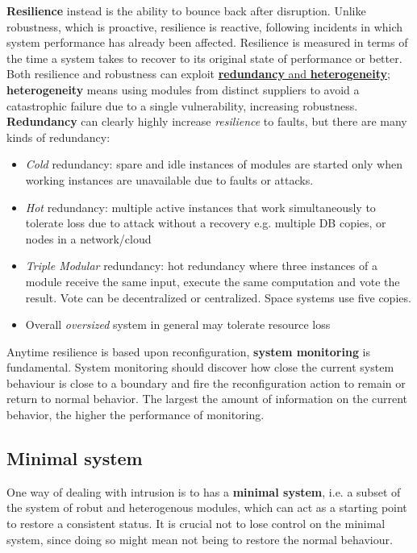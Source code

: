 \textbf{Resilience} instead is the ability to bounce back after disruption. Unlike
robustness, which is proactive, resilience is reactive, following
incidents in which system performance has already been affected.
Resilience is measured in terms of the time a system takes to recover
to its original state of performance or better.
\nl
Both resilience and robustness can exploit \ul{\textbf{redundancy} and \textbf{heterogeneity}};\\
\textbf{heterogeneity} means using modules from distinct suppliers to avoid a catastrophic failure due to a single vulnerability, increasing robustness.\\
\textbf{Redundancy} can clearly highly increase \textit{resilience} to faults,
but there are many kinds of redundancy:
\begin{itemize}
    \item \textit{Cold} redundancy: spare and idle instances of modules are started only when working instances are unavailable due to faults or attacks.
    \item \textit{Hot} redundancy: multiple active instances that work simultaneously to tolerate loss due to attack without a recovery e.g. multiple DB copies, or nodes in a network/cloud
    \item \textit{Triple Modular} redundancy: hot redundancy where three instances of a
    module receive the same input, execute the same computation and vote the
    result. Vote can be decentralized or centralized. Space systems use five copies.
    \item Overall \textit{oversized} system in general may tolerate resource loss
\end{itemize}

Anytime resilience is based upon reconfiguration, \textbf{system monitoring} is fundamental.
System monitoring should discover how close the current system behaviour is close to a boundary and fire the reconfiguration action to remain or return to normal behavior.
The largest the amount of information on the current behavior, the higher the performance of monitoring.

\subsection{Minimal system}
One way of dealing with intrusion is to has a \textbf{minimal system}, i.e. a subset of the system of robut and heterogenous modules,
which can act as a starting point to restore a consistent status.
It is crucial not to lose control on the minimal system,
since doing so might mean not being to restore the normal behaviour.

